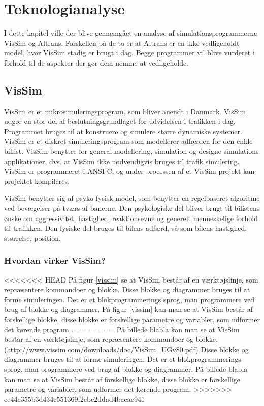 \chapter{Teknologianalyse}\label{Teknologianalyse}

I dette kapitel ville der blive gennemgået en analyse af simulationsprogrammerne VisSim og Altrans. Forskellen på de to er at Altrans er en ikke-vedligeholdt model, hvor VisSim stadig er brugt i dag. Begge programmer vil blive vurderet i forhold til de aspekter der gør dem nemme at vedligeholde. %

\section{VisSim}
VisSim er et mikrosimuleringsprogram, som bliver anendt i Danmark. VisSim udgør en stor del af beslutningsgrundlaget for udvidelsen i trafikken i dag. Programmet bruges til at konstruere og simulere større dynamiske systemer. VisSim er et diskret simuleringsprogram som modellerer adfærden for den enkle billist. VisSim benyttes for general modellering, simulation og designe simulations applikationer, dvs. at VisSim ikke nødvendigvis bruges til trafik simulering. VisSim er programmeret i ANSI C, og under processen af et VisSim projekt kan projektet kompileres.

VisSim benytter sig af psyko fysisk model, som benytter en regelbaseret algoritme ved bevægelser på tværs af banerne. Den psykologiske del bliver brugt til bilistens ønske om aggressivitet, hastighed, reaktionsevne og generelt menneskelige forhold til trafikken. Den fysiske del bruges til bilens adfærd, så som bilens hastighed, størrelse, position. 


\subsection{Hvordan virker VisSim?}
<<<<<<< HEAD
På figur \ref{vissim} se at VisSim består af en værktøjslinje, som repræsentere kommandoer og blokke. Disse blokke og diagrammer bruges til at forme simuleringen. Det er et blokprogrammerings sprog, man programmere ved brug af blokke og diagrammer. På figur \ref{vissim} kan man se at VisSim består af forskellige blokke, disse blokke er forskellige parametre og variabler, som udformer det kørende program \cite{vissimfunker}.
=======
På billede blabla kan man se at VisSim består af en værktøjslinje, som repræsentere kommandoer og blokke.(http://www.vissim.com/downloads/doc/VisSim\_UGv80.pdf)
Disse blokke og diagrammer bruges til at forme simuleringen. Det er et blokprogrammerings sprog, man programmere ved brug af blokke og diagrammer. På billede blabla kan man se at VisSim består af forskellige blokke, disse blokke er forskellige parametre og variabler, som udformer det kørende program.
>>>>>>> ee44e355b3d434c551369f2ebe2ddad4baeac941

